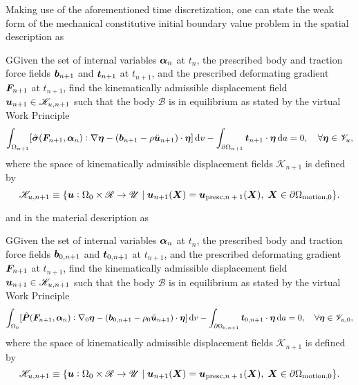 Making use of the aforementioned time discretization, one can state the weak form of the mechanical constitutive initial boundary value problem in the spatial description as
\begin{problem}
    GGiven the set of internal variables $\bm{\alpha}_n$ at $t_n$, the prescribed body and traction force fields $\bm{b}_{n+1}$ and $\bm{t}_{n+1}$ at $t_{n+1}$, and the prescribed deformating gradient $\bm{F}_{n+1}$ at $t_{n+1}$, find the kinematically admissible displacement field $\bm{u}_{n+1}\in\mathscr{K}_{u,n+1}$ such that the body $\mathscr{B}$ is in equilibrium as stated by the virtual Work Principle
            \begin{equation}
        \int_{\Omega_{n+1}} [\hat{\bm{\sigma}}(\bm{F}_{n+1}, \bm{\alpha}_n):\nabla \bm{\eta} - (\bm{b}_{n+1}-\rho\ddot{\bm u}_{n+1})\cdot \bm{\eta}]\,\mathrm{d} v - \int_{\partial\Omega_{n+1}} \bm{t}_{n+1}\cdot \bm{\eta}\,\mathrm{d} a = 0,\quad \forall \bm{\eta} \in \mathscr{V}_u,
    \end{equation}
    where the space of kinematically admissible displacement fields $\mathscr{K}_{n+1}$ is defined by
    \begin{equation}
            \mathscr{K}_{u,n+1}\equiv \{\bm{u}:\Omega_0\times \mathscr{R}\to \mathscr{U}\;|\;\bm{u}_{n+1}(\bm{X}) = \bm{u}_\text{presc,$n+1$}(\bm{X}),\;\bm{X}\in\partial \Omega_\text{motion,0}\}.
    \end{equation}
\end{problem}
and in the material description as
\begin{problem}
    GGiven the set of internal variables $\bm{\alpha}_n$ at $t_n$, the prescribed body and traction force fields $\bm{b}_{0,n+1}$ and $\bm{t}_{0,n+1}$ at $t_{n+1}$, and the prescribed deformating gradient $\bm{F}_{n+1}$ at $t_{n+1}$, find the kinematically admissible displacement field $\bm{u}_{n+1}\in\mathscr{K}_{u,n+1}$ such that the body $\mathscr{B}$ is in equilibrium as stated by the virtual Work Principle
            \begin{equation}
        \int_{\Omega_0} [\hat{\bm{P}}(\bm{F}_{n+1}, \bm{\alpha}_n):\nabla_0 \bm{\eta} - (\bm{b}_{0,n+1}-\rho_0\ddot{\bm u}_{n+1})\cdot \bm{\eta}]\,\mathrm{d} v - \int_{\partial\Omega_{0,n+1}} \bm{t}_{0,n+1}\cdot \bm{\eta}\,\mathrm{d} a = 0,\quad \forall \bm{\eta} \in \mathscr{V}_{u,0},
    \end{equation}
    where the space of kinematically admissible displacement fields $\mathscr{K}_{n+1}$ is defined by
    \begin{equation}
            \mathscr{K}_{u,n+1}\equiv \{\bm{u}:\Omega_0\times \mathscr{R}\to \mathscr{U}\;|\;\bm{u}_{n+1}(\bm{X}) = \bm{u}_\text{presc,$n+1$}(\bm{X}),\;\bm{X}\in\partial \Omega_\text{motion,0}\}.
    \end{equation}
\end{problem}

